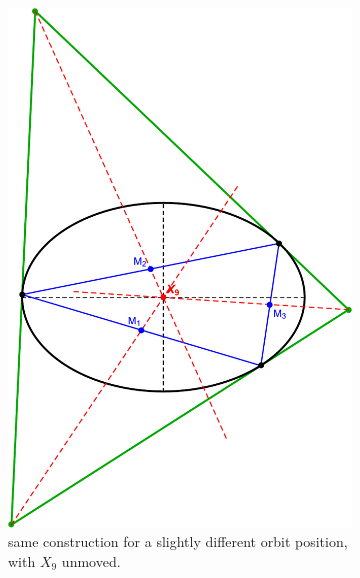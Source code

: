 \begin{figure}[H]
\begin{subfigure}[t]{0.29\textwidth}
         \centering
         \includegraphics[height=1.75\linewidth]{pics/0052_mitten_rot.pdf}
         \caption{same construction for a slightly different orbit position, with $X_9$ unmoved.}
         \label{fig:mitten-rot}
     \end{subfigure}
     \hfill
     \begin{subfigure}[t]{0.29\textwidth}
         \centering

\end{subfigure}
\end{figure}
